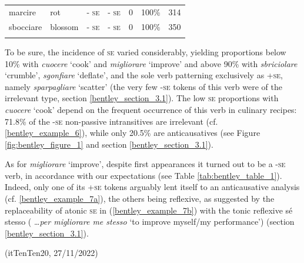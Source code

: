 \documentclass[output=paper,colorlinks,citecolor=brown
]{langscibook}
\begin{document}
\begin{table}[hbt!]
{\begin{tabular}{|p{}|p{}||p{}|p{}||p{}|p{}||p{}|}
marcire      & rot       & - \textsc{se}                                                                                     & - \textsc{se}                                                                          & 0                                 & 100\%                                     & 314                 \\
sbocciare    & blossom   & - \textsc{se}                                                                                     & - \textsc{se}                                                                          & 0                                 & 100\%                                     & 350    \\   \lspbottomrule         
\end{tabular}}
\end{table}

To be sure, the incidence of \textsc{se} varied considerably, yielding proportions below 10\% with \textit{cuocere} ‘cook’ and \textit{migliorare} ‘improve’ and above 90\% with \textit{sbriciolare} ‘crumble’, \textit{sgonfiare} ‘deflate’, and the sole verb patterning exclusively as +\textsc{se}, namely \textit{sparpagliare} ‘scatter’ (the very few -\textsc{se} tokens of this verb were of the irrelevant type, section \ref{bentley_section_3.1}). The low \textsc{se} proportions with \textit{cuocere} ‘cook’ depend on the frequent occurrence of this verb in culinary recipes: 71.8\% of the -\textsc{se} non-passive intransitives are irrelevant (cf. \ref{bentley_example_6}), while only 20.5\% are anticausatives (see Figure \ref{fig:bentley_figure_1} and section \ref{bentley_section_3.1}).

As for \textit{migliorare} ‘improve’, despite first appearances it turned out to be a -\textsc{se} verb, in accordance with our expectations (see Table \ref{tab:bentley_table_1}). Indeed, only one of its +\textsc{se} tokens arguably lent itself to an anticausative analysis (cf. \ref{bentley_example_7a}), the others being reflexive, as suggested by the replaceability of atonic \textsc{se} in (\ref{bentley_example_7b}) with the tonic reflexive sé stesso ( \ldots  \textit{per migliorare me stesso} ‘to improve myself/my performance’) (section \ref{bentley_section_3.1}).

\hspace*{\fill}(itTenTen20, 27/11/2022)\quad
\end{document}
